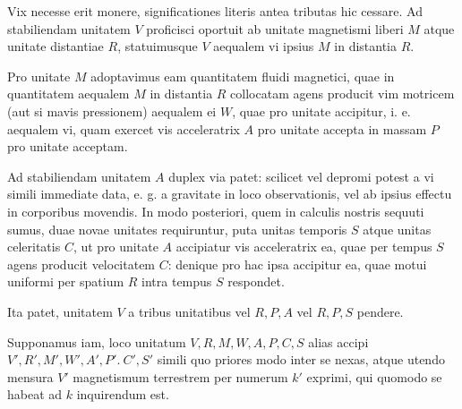 \expandafter\def\csname HistoricalNoteText13\endcsname{Vix necesse erit monere, significationes literis antea tributas hic cessare.}
Ad stabiliendam unitatem $V$ proficisci oportuit ab unitate magnetismi liberi $M$ atque unitate distantiae $R$, statuimusque $V$ aequalem vi ipsius $M$ in distantia $R$.

Pro unitate $M$ adoptavimus eam quantitatem fluidi magnetici, quae in quantitatem aequalem $M$ in distantia $R$ collocatam agens producit vim motricem (aut si mavis pressionem) aequalem ei $W$, quae pro unitate accipitur, i. e. aequalem vi, quam exercet vis acceleratrix $A$ pro unitate accepta in massam $P$ pro unitate acceptam.

Ad stabiliendam unitatem $A$ duplex via patet: scilicet vel depromi potest a vi simili immediate data, e. g. a gravitate in loco observationis, vel ab ipsius effectu in corporibus movendis. In modo posteriori, quem in calculis nostris sequuti sumus, duae novae unitates requiruntur, puta unitas temporis $S$ atque unitas celeritatis $C$, ut pro unitate $A$ accipiatur vis acceleratrix ea, quae per tempus $S$ agens producit velocitatem $C$: denique pro hac ipsa accipitur ea, quae motui uniformi per spatium $R$ intra tempus $S$ respondet.

Ita patet, unitatem $V$ a tribus unitatibus vel $R,P,A$ vel $R,P,S$ pendere.

Supponamus iam, loco unitatum $V,R,M,W,A,P,C,S$ alias accipi $V',\allowbreak R',\allowbreak M',\allowbreak W',\allowbreak A',\allowbreak P'.\allowbreak\ C',\allowbreak S'$ simili quo priores modo inter se nexas, atque utendo mensura $V'$ magnetismum terrestrem per numerum $k'$ exprimi, qui quomodo se habeat ad $k$ inquirendum est.

